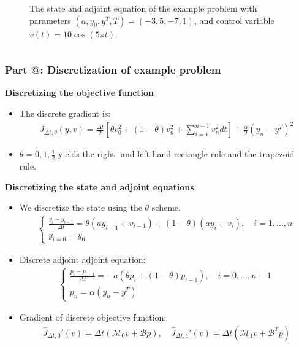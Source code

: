 \documentclass[9pt]{beamer}
\makeatletter
\newcommand*{\rom}[1]{\expandafter\@slowromancap\romannumeral #1@}
\makeatother
\begin{document}
\begin{frame}
\begin{columns}
\begin{figure}
\caption{{\tiny The state and adjoint equation of the example problem with parameters $(a,y_0,y^T,T)=(-3,5,-7,1)$, and control variable $v(t)=10\cos(5\pi t)$.}}
\end{figure}
\end{columns}
\end{frame}

\begin{frame}
\frametitle{\textbf{ Part \rom{2}:} Discretization of example problem}
\textbf{Discretizing the objective function}
\begin{itemize}
\item{The discrete gradient is:{\small\begin{align*}
J_{\Delta t,\theta}(y,v) = \frac{\Delta t}{2}[\theta v_0^2 +(1-\theta)v_n^2+\sum_{i=1}^{n-1}v_n^2dt] + \frac{\alpha}{2}(y_n-y^T)^2
\end{align*}
}}
\item{$\theta=0,1,\frac{1}{2}$ yields the right- and left-hand rectangle rule and the trapezoid rule.}
\end{itemize}
\textbf{Discretizing the state and adjoint equations}
\begin{itemize}
\item{We discretize the state using the $\theta$ scheme.
{\small\begin{align*}
\left\{
     \begin{array}{lr}
	\frac{y_i-y_{i-1}}{\Delta t} = \theta(ay_{i-1} +v_{i-1})+(1-\theta)(ay_i +v_i),\quad i=1,...,n\\
	y_{i=0}=y_0
	\end{array}
   \right. 
\end{align*}
}}
\item{Discrete adjoint adjoint equation:{\small\begin{align*}
\left\{
     \begin{array}{lr}
	\frac{p_i-p_{i-1}}{\Delta t} = -a(\theta p_i+(1-\theta)p_{i-1}),\quad i=0,...,n-1\\
	p_{n}=\alpha(y_n-y^T)
	\end{array}
   \right.
\end{align*}}}
\item<2>{Gradient of discrete objective function:
{\small\begin{align*}
\hat J_{\Delta t,0}'(v) = \Delta t(\mathcal{M}_{0}v+\mathcal{B} p),\quad \hat J_{\Delta t,1}'(v) = \Delta t(\mathcal{M}_{1}v+\mathcal{B}^T p)

\end{align*}}}
\end{itemize}
\end{frame}
\end{document}
